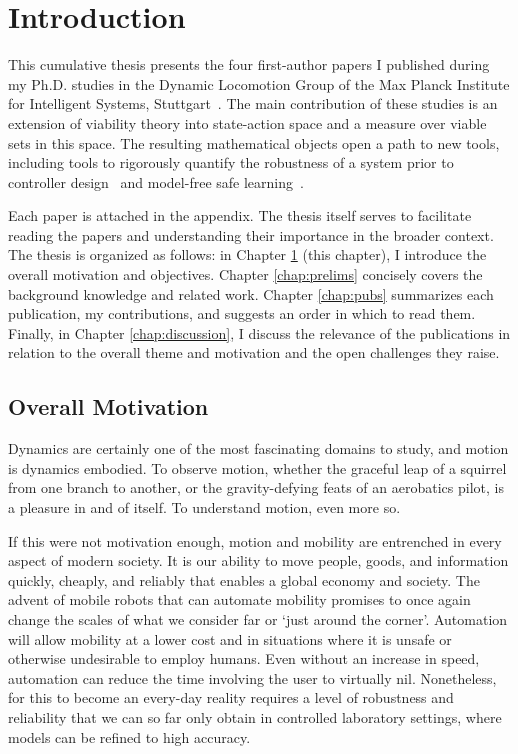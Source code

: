 
\chapter{Introduction} \label{chap:intro}
This cumulative thesis presents the four first-author papers I published during my Ph.D. studies in the Dynamic Locomotion Group of the Max Planck Institute for Intelligent Systems, Stuttgart~\cite{heim2018shaping,heim2019beyond,heim2019learnable,heim2018unviable}. The main contribution of these studies is an extension of viability theory into state-action space and a measure over viable sets in this space.
The resulting mathematical objects open a path to new tools, including tools to rigorously quantify the robustness of a system prior to controller design~\cite{heim2019beyond} and model-free safe learning~\cite{heim2019learnable}. \par
Each paper is attached in the appendix. The thesis itself serves to facilitate reading the papers and understanding their importance in the broader context. The thesis is organized as follows: in Chapter \ref{chap:intro} (this chapter), I introduce the overall motivation and objectives.
Chapter \ref{chap:prelims} concisely covers the background knowledge and related work.
Chapter \ref{chap:pubs} summarizes each publication, my contributions, and suggests an order in which to read them.
Finally, in Chapter \ref{chap:discussion}, I discuss the relevance of the publications in relation to the overall theme and motivation and the open challenges they raise.

\section{Overall Motivation}

Dynamics are certainly one of the most fascinating domains to study, and motion is dynamics embodied. To observe motion, whether the graceful leap of a squirrel from one branch to another, or the gravity-defying feats of an aerobatics pilot, is a pleasure in and of itself. To understand motion, even more so. \par

If this were not motivation enough, motion and mobility are entrenched in every aspect of modern society. It is our ability to move people, goods, and information quickly, cheaply, and reliably that enables a global economy and society. The advent of mobile robots that can automate mobility promises to once again change the scales of what we consider far or `just around the corner'. Automation will allow mobility at a lower cost and in situations where it is unsafe or otherwise undesirable to employ humans. Even without an increase in speed, automation can reduce the time involving the user to virtually nil. Nonetheless, for this to become an every-day reality requires a level of robustness and reliability that we can so far only obtain in controlled laboratory settings, where models can be refined to high accuracy. \par

